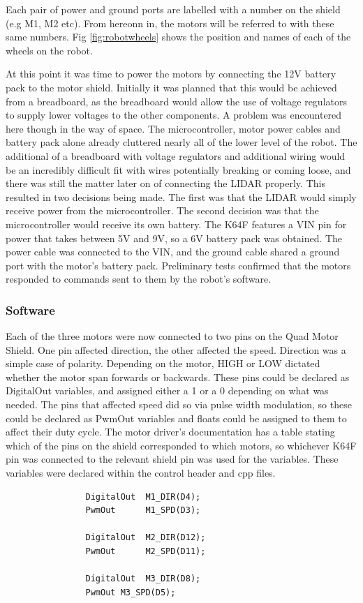 				Each pair of power and ground ports are labelled with a number on the shield (e.g M1, M2 etc). From hereonn in, the motors will be referred to with these same numbers. Fig \ref{fig:robotwheels} shows the position and names of each of the wheels on the robot.
				
				
				At this point it was time to power the motors by connecting the 12V battery pack to the motor shield. Initially it was planned that this would be achieved from a breadboard, as the breadboard would allow the use of voltage regulators to supply lower voltages to the other components. A problem was encountered here though in the way of space. The microcontroller, motor power cables and battery pack alone already cluttered nearly all of the lower level of the robot. The additional of a breadboard with voltage regulators and additional wiring would be an incredibly difficult fit with wires potentially breaking or coming loose, and there was still the matter later on of connecting the LIDAR properly. This resulted in two decisions being made. The first was that the LIDAR would simply receive power from the microcontroller. The second decision was that the microcontroller would receive its own battery. The K64F features a VIN pin for power that takes between 5V and 9V, so a 6V battery pack was obtained. The power cable was connected to the VIN, and the ground cable shared a ground port with the motor's battery pack. Preliminary tests confirmed that the motors responded to commands sent to them by the robot's software.
				
				\subsubsection{Software}
				Each of the three motors were now connected to two pins on the Quad Motor Shield. One pin affected direction, the other affected the speed. Direction was a simple case of polarity. Depending on the motor, HIGH or LOW dictated whether the motor span forwards or backwards. These pins could be declared as DigitalOut variables, and assigned either a 1 or a 0 depending on what was needed.  The pins that affected speed did so via pulse width modulation, so these could be declared as PwmOut variables and floats could be assigned to them to affect their duty cycle. The motor driver's documentation has a table stating which of the pins on the shield corresponded to which motors, so whichever K64F pin was connected to the relevant shield pin was used for the variables. These variables were declared within the control header and cpp files.
				\begin{lstlisting}
				DigitalOut  M1_DIR(D4);
				PwmOut      M1_SPD(D3);
				
				DigitalOut  M2_DIR(D12);
				PwmOut      M2_SPD(D11);
				
				DigitalOut  M3_DIR(D8);
				PwmOut M3_SPD(D5);
				\end{lstlisting}
				
